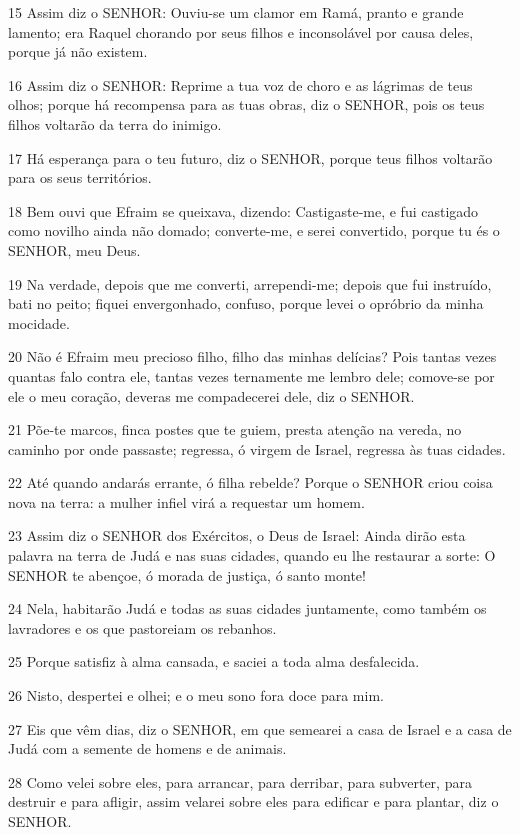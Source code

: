 \par 15 Assim diz o SENHOR: Ouviu-se um clamor em Ramá, pranto e grande lamento; era Raquel chorando por seus filhos e inconsolável por causa deles, porque já não existem.
\par 16 Assim diz o SENHOR: Reprime a tua voz de choro e as lágrimas de teus olhos; porque há recompensa para as tuas obras, diz o SENHOR, pois os teus filhos voltarão da terra do inimigo.
\par 17 Há esperança para o teu futuro, diz o SENHOR, porque teus filhos voltarão para os seus territórios.
\par 18 Bem ouvi que Efraim se queixava, dizendo: Castigaste-me, e fui castigado como novilho ainda não domado; converte-me, e serei convertido, porque tu és o SENHOR, meu Deus.
\par 19 Na verdade, depois que me converti, arrependi-me; depois que fui instruído, bati no peito; fiquei envergonhado, confuso, porque levei o opróbrio da minha mocidade.
\par 20 Não é Efraim meu precioso filho, filho das minhas delícias? Pois tantas vezes quantas falo contra ele, tantas vezes ternamente me lembro dele; comove-se por ele o meu coração, deveras me compadecerei dele, diz o SENHOR.
\par 21 Põe-te marcos, finca postes que te guiem, presta atenção na vereda, no caminho por onde passaste; regressa, ó virgem de Israel, regressa às tuas cidades.
\par 22 Até quando andarás errante, ó filha rebelde? Porque o SENHOR criou coisa nova na terra: a mulher infiel virá a requestar um homem.
\par 23 Assim diz o SENHOR dos Exércitos, o Deus de Israel: Ainda dirão esta palavra na terra de Judá e nas suas cidades, quando eu lhe restaurar a sorte: O SENHOR te abençoe, ó morada de justiça, ó santo monte!
\par 24 Nela, habitarão Judá e todas as suas cidades juntamente, como também os lavradores e os que pastoreiam os rebanhos.
\par 25 Porque satisfiz à alma cansada, e saciei a toda alma desfalecida.
\par 26 Nisto, despertei e olhei; e o meu sono fora doce para mim.
\par 27 Eis que vêm dias, diz o SENHOR, em que semearei a casa de Israel e a casa de Judá com a semente de homens e de animais.
\par 28 Como velei sobre eles, para arrancar, para derribar, para subverter, para destruir e para afligir, assim velarei sobre eles para edificar e para plantar, diz o SENHOR.

